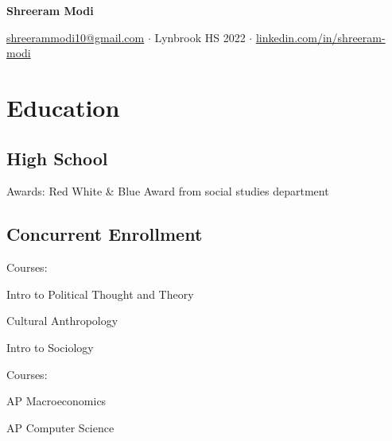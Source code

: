 \documentclass[letterpaper]{resume-shreeram}
\begin{document}
\begin{center}
  {\Huge \bfseries Shreeram Modi}

  \href{mailto:shreerammodi10@gmail.com}{shreerammodi10@gmail.com} $\cdot$ Lynbrook HS 2022 $\cdot$ \href{https://linkedin.com/in/shreeram-modi}{linkedin.com/in/shreeram-modi}
\end{center}


\section{Education}

\subsection{High School}

\begin{compactitem}
  \item Awards: Red White \& Blue Award from social studies department
\end{compactitem}

\subsection{Concurrent Enrollment}

\begin{compactitem}
  \item Courses:
  \begin{compactitem}
    \item Intro to Political Thought and Theory
    \item Cultural Anthropology
    \item Intro to Sociology
  \end{compactitem}
\end{compactitem}

\begin{compactitem}
  \item Courses:
  \begin{compactitem}
    \item AP Macroeconomics
    \item AP Computer Science
  \end{compactitem}
\end{compactitem}
\end{document}
